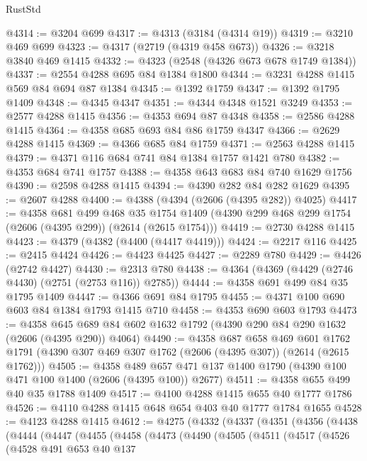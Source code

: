 \begin{lexlean}{RustStd}
\begin{coremodule}
@4314 := @3204 @699
@4317 := @4313 (@3184 (@4314 @19))
@4319 := @3210 @469 @699
@4323 := @4317 (@2719 (@4319 @458 @673))
@4326 := @3218 @3840 @469 @1415
@4332 := @4323 (@2548 (@4326 @673 @678 @1749 @1384))
@4337 := @2554 @4288 @695 @84 @1384 @1800
@4344 := @3231 @4288 @1415 @569 @84 @694 @87 @1384
@4345 := @1392 @1759
@4347 := @1392 @1795 @1409
@4348 := @4345 @4347
@4351 := @4344 @4348 @1521 @3249
@4353 := @2577 @4288 @1415
@4356 := @4353 @694 @87 @4348
@4358 := @2586 @4288 @1415
@4364 := @4358 @685 @693 @84 @86 @1759 @4347
@4366 := @2629 @4288 @1415
@4369 := @4366 @685 @84 @1759
@4371 := @2563 @4288 @1415
@4379 := @4371 @116 @684 @741 @84 @1384 @1757 @1421 @780
@4382 := @4353 @684 @741 @1757
@4388 := @4358 @643 @683 @84 @740 @1629 @1756
@4390 := @2598 @4288 @1415
@4394 := @4390 @282 @84 @282 @1629
@4395 := @2607 @4288
@4400 := @4388 (@4394 (@2606 (@4395 @282)) @4025)
@4417 := @4358
    @681
    @499
    @468
    @35
    @1754
    @1409
    (@4390 @299 @468 @299 @1754 (@2606 (@4395 @299)) (@2614 (@2615 @1754)))
@4419 := @2730 @4288 @1415
@4423 := @4379 (@4382 (@4400 (@4417 @4419)))
@4424 := @2217 @116
@4425 := @2415 @4424
@4426 := @4423 @4425
@4427 := @2289 @780
@4429 := @4426 (@2742 @4427)
@4430 := @2313 @780
@4438 := @4364 (@4369 (@4429 (@2746 @4430) (@2751 (@2753 @116)) @2785))
@4444 := @4358 @691 @499 @84 @35 @1795 @1409
@4447 := @4366 @691 @84 @1795
@4455 := @4371 @100 @690 @603 @84 @1384 @1793 @1415 @710
@4458 := @4353 @690 @603 @1793
@4473 := @4358 @645 @689 @84 @602 @1632 @1792 (@4390 @290 @84 @290 @1632 (@2606 (@4395 @290)) @4064)
@4490 := @4358
    @687
    @658
    @469
    @601
    @1762
    @1791
    (@4390 @307 @469 @307 @1762 (@2606 (@4395 @307)) (@2614 (@2615 @1762)))
@4505 := @4358
    @489
    @657
    @471
    @137
    @1400
    @1790
    (@4390 @100 @471 @100 @1400 (@2606 (@4395 @100)) @2677)
@4511 := @4358 @655 @499 @40 @35 @1788 @1409
@4517 := @4100 @4288 @1415 @655 @40 @1777 @1786
@4526 := @4110 @4288 @1415 @648 @654 @403 @40 @1777 @1784 @1655
@4528 := @4123 @4288 @1415
@4612 := @4275
    (@4332
      (@4337
        (@4351
          (@4356
            (@4438
              (@4444
                (@4447
                  (@4455
                    (@4458
                      (@4473
                        (@4490
                          (@4505
                            (@4511
                              (@4517
                                (@4526
                                  (@4528
                                    @491
                                    @653
                                    @40
                                    @137

\end{coremodule}
\end{lexlean}
